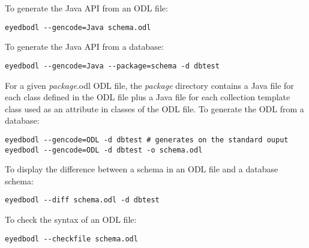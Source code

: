 
To generate the Java API from an ODL file:
\vspace{-2mm}
\begin{verbatim}
eyedbodl --gencode=Java schema.odl
\end{verbatim}
To generate the Java API from a database:
\vspace{-2mm}
\begin{verbatim}
eyedbodl --gencode=Java --package=schema -d dbtest
\end{verbatim}
For a given \emph{package}.odl ODL file, 
the \emph{package} directory contains a Java file for each class
defined in the ODL file plus a Java file for each collection template
class used as an attribute in classes of the ODL file.
To generate the ODL from a database:
\vspace{-2mm}
\begin{verbatim}
eyedbodl --gencode=ODL -d dbtest # generates on the standard ouput
eyedbodl --gencode=ODL -d dbtest -o schema.odl
\end{verbatim}

To display the difference between a schema in an ODL file and a database
schema:
\vspace{-2mm}
\begin{verbatim}
eyedbodl --diff schema.odl -d dbtest
\end{verbatim}

To check the syntax of an ODL file:
\vspace{-2mm}
\begin{verbatim}
eyedbodl --checkfile schema.odl
\end{verbatim}

